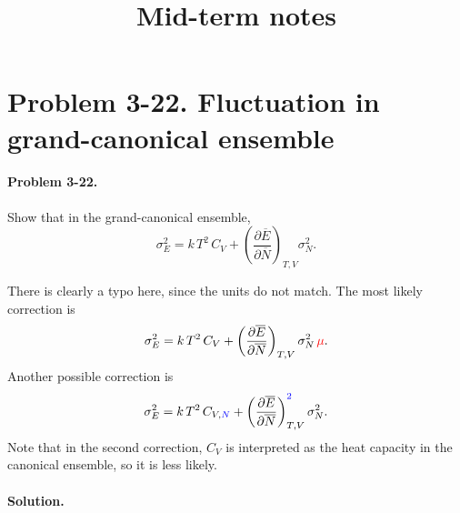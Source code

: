 \documentclass{article}
\begin{document}
\tableofcontents
\title{Mid-term notes}
\author{\vspace{-10ex}}
\date{\vspace{-10ex}}

\section{Problem 3-22. Fluctuation in grand-canonical ensemble}

\paragraph{Problem 3-22.}
Show that in the grand-canonical ensemble,
$$
\sigma_E^2 = k \, T^2 \, C_V
  + \left( \frac{\partial \overline E } { \partial \overline N} \right)_{T, V} \sigma_N^2.
$$

There is clearly a typo here, since the units do not match.
%
The most likely correction is
\begin{equation}
  \sigma_E^2 = k \, T^2 \, C_V
  + \left( \frac{\partial \overline E } { \partial \overline N} \right)_{T, V} \sigma_N^2 \, \textcolor{red}{\mu}.
  \label{eq:prob3-22a}
\end{equation}
%
Another possible correction is
%
\begin{equation}
  \sigma_E^2 = k \, T^2 \, C_{V,\textcolor{blue}{N}}
  + \left( \frac{\partial \overline E } { \partial \overline N} \right)_{T, V}^{\textcolor{blue}{2}} \sigma_N^2.
  \label{eq:prob3-22b}
\end{equation}
%
Note that in the second correction,
$C_V$ is interpreted as the heat capacity in the canonical ensemble,
so it is less likely.

\paragraph{Solution.}
\end{document}
